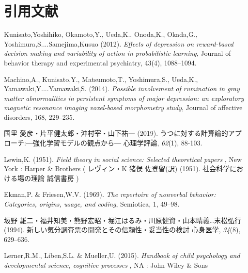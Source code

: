 \hypertarget{ux5f15ux7528ux6587ux732e}{%
    \section{引用文献}\label{ux5f15ux7528ux6587ux732e}}
\hypertarget{refs}{}
    \leavevmode\hypertarget{ref-Kunisato2012}{}%
Kunisato,Yoshihiko, Okamoto,Y., Ueda,K., Onoda,K., Okada,G., Yoshimura,S....Samejima,Kusuo (2012). \emph{Effects of depression on reward-based decision making and variability of action in probabilistic learning}, Journal of behavior therapy and experimental psychiatry, 43(4), 1088--1094.


\hypertarget{refs}{}
    \leavevmode\hypertarget{ref-Machino2014}{}%
Machino,A., Kunisato,Y., Matsumoto,T., Yoshimura,S., Ueda,K., Yamawaki,Y....Yamawaki,S. (2014). \emph{Possible involvement of rumination in gray matter abnormalities in persistent symptoms of major depression: an exploratory magnetic resonance imaging voxel-based morphometry study}, Journal of affective disorders, 168, 229--235.


\hypertarget{refs}{}
    \leavevmode\hypertarget{ref-kunisato2019}{}%
国里 愛彦・片平健太郎・沖村宰・山下祐一 (2019). うつに対する計算論的アプローチ:―強化学習モデルの観点から― 心理学評論, \emph{62}(1), 88-103.


\hypertarget{refs}{}
    \leavevmode\hypertarget{ref-Lewin}{}%
Lewin,K. (1951). \emph{Field theory in social science: Selected theoretical papers} , New York : Harper \& Brothers ( レヴィン・K 猪俣 佐登留(訳) (1951). 社会科学における場の理論 誠信書房 )


\hypertarget{refs}{}
    \leavevmode\hypertarget{ref-ekman1969}{}%
Ekman,P. \& Friesen,W.V. (1969). \emph{The repertoire of nonverbal behavior: Categories, origins, usage, and coding}, Semiotica, 1, 49--98.


\hypertarget{refs}{}
    \leavevmode\hypertarget{ref-ux5742ux91ceux96c4ux4e8c1994}{}%
坂野 雄二・福井知美・熊野宏昭・堀江はるみ・川原健資・山本晴義…末松弘行 (1994). 新しい気分調査票の開発とその信頼性・妥当性の検討 心身医学, \emph{34}(8), 629--636.


\hypertarget{refs}{}
    \leavevmode\hypertarget{ref-lerner2015handbook}{}%
Lerner,R.M., Liben,S.L. \& Mueller,U. (2015). \emph{Handbook of child psychology and developmental science, cognitive processes} , NA : John Wiley \& Sons



